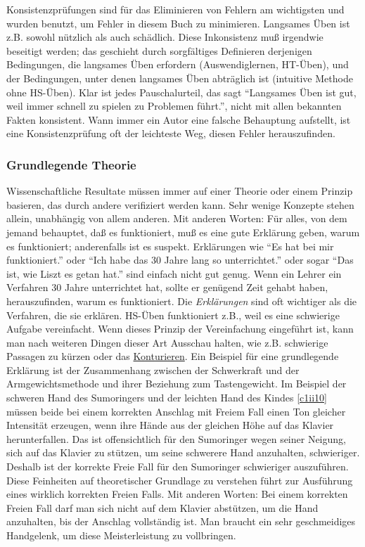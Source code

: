 Konsistenzprüfungen sind für das Eliminieren von Fehlern am wichtigsten und wurden benutzt, um Fehler in diesem Buch zu minimieren.
Langsames Üben ist z.B. sowohl nützlich als auch schädlich.
Diese Inkonsistenz muß irgendwie beseitigt werden; das geschieht durch sorgfältiges Definieren derjenigen Bedingungen, die langsames Üben erfordern (Auswendiglernen, HT-Üben), und der Bedingungen, unter denen langsames Üben abträglich ist (intuitive Methode ohne HS-Üben).
Klar ist jedes Pauschalurteil, das sagt \enquote{Langsames Üben ist gut, weil immer schnell zu spielen zu Problemen führt.}, nicht mit allen bekannten Fakten konsistent.
Wann immer ein Autor eine falsche Behauptung aufstellt, ist eine Konsistenzprüfung oft der leichteste Weg, diesen Fehler herauszufinden.


\subsubsection{Grundlegende Theorie}
\label{c3_3f}

Wissenschaftliche Resultate müssen immer auf einer Theorie oder einem Prinzip basieren, das durch andere verifiziert werden kann.
Sehr wenige Konzepte stehen allein, unabhängig von allem anderen.
Mit anderen Worten: Für alles, von dem jemand behauptet, daß es funktioniert, muß es eine gute Erklärung geben, warum es funktioniert; anderenfalls ist es suspekt.
Erklärungen wie \enquote{Es hat bei mir funktioniert.} oder \enquote{Ich habe das 30 Jahre lang so unterrichtet.} oder sogar \enquote{Das ist, wie Liszt es getan hat.} sind einfach nicht gut genug.
Wenn ein Lehrer ein Verfahren 30 Jahre unterrichtet hat, sollte er genügend Zeit gehabt haben, herauszufinden, warum es funktioniert.
Die \textit{Erklärungen} sind oft wichtiger als die Verfahren, die sie erklären.
HS-Üben funktioniert z.B., weil es eine schwierige Aufgabe vereinfacht.
Wenn dieses Prinzip der Vereinfachung eingeführt ist, kann man nach weiteren Dingen dieser Art Ausschau halten, wie z.B. schwierige Passagen zu kürzen oder das \hyperref[c1iii8]{Konturieren}.
Ein Beispiel für eine grundlegende Erklärung ist der Zusammenhang zwischen der Schwerkraft und der Armgewichtsmethode und ihrer Beziehung zum Tastengewicht.
Im Beispiel der schweren Hand des Sumoringers und der leichten Hand des Kindes \hyperref[c1ii10]{\autoref{c1ii10}} müssen beide bei einem korrekten Anschlag mit Freiem Fall einen Ton gleicher Intensität erzeugen, wenn ihre Hände aus der gleichen Höhe auf das Klavier herunterfallen.
Das ist offensichtlich  für den Sumoringer wegen seiner Neigung, sich auf das Klavier zu stützen, um seine schwerere Hand anzuhalten, schwieriger.
Deshalb ist der korrekte Freie Fall für den Sumoringer schwieriger auszuführen.
Diese Feinheiten auf theoretischer Grundlage zu verstehen führt zur Ausführung eines wirklich korrekten Freien Falls.
Mit anderen Worten: Bei einem korrekten Freien Fall darf man sich nicht auf dem Klavier abstützen, um die Hand anzuhalten, bis der Anschlag vollständig ist.
Man braucht ein sehr geschmeidiges Handgelenk, um diese Meisterleistung zu vollbringen.

